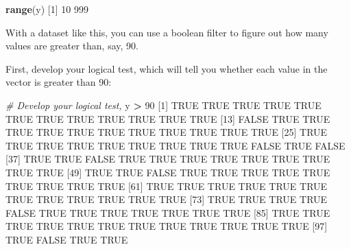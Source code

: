 \documentclass[]{book}
\newenvironment{Shaded}{\begin{snugshade}}{\end{snugshade}}
\newcommand{\CommentTok}[1]{\textcolor[rgb]{0.56,0.35,0.01}{\textit{#1}}}
\newcommand{\DecValTok}[1]{\textcolor[rgb]{0.00,0.00,0.81}{#1}}
\newcommand{\KeywordTok}[1]{\textcolor[rgb]{0.13,0.29,0.53}{\textbf{#1}}}
\newcommand{\NormalTok}[1]{#1}
\newcommand{\OperatorTok}[1]{\textcolor[rgb]{0.81,0.36,0.00}{\textbf{#1}}}
\newcommand{\OtherTok}[1]{\textcolor[rgb]{0.56,0.35,0.01}{#1}}
\newcommand{\StringTok}[1]{\textcolor[rgb]{0.31,0.60,0.02}{#1}}
\begin{document}
\begin{Shaded}
\begin{Highlighting}[]
\KeywordTok{range}\NormalTok{(y)}
\NormalTok{[}\DecValTok{1}\NormalTok{]  }\DecValTok{10} \DecValTok{999}
\end{Highlighting}
\end{Shaded}

With a dataset like this, you can use a boolean filter to figure out how many values are greater than, say, 90.

First, develop your logical test, which will tell you whether each value in the vector is greater than 90:

\begin{Shaded}
\begin{Highlighting}[]
\CommentTok{# Develop your logical test,}
\NormalTok{y }\OperatorTok{>}\StringTok{ }\DecValTok{90}
\NormalTok{  [}\DecValTok{1}\NormalTok{]  }\OtherTok{TRUE}  \OtherTok{TRUE}  \OtherTok{TRUE}  \OtherTok{TRUE}  \OtherTok{TRUE}  \OtherTok{TRUE}  \OtherTok{TRUE}  \OtherTok{TRUE}  \OtherTok{TRUE}  \OtherTok{TRUE}  \OtherTok{TRUE}  \OtherTok{TRUE}
\NormalTok{ [}\DecValTok{13}\NormalTok{] }\OtherTok{FALSE}  \OtherTok{TRUE}  \OtherTok{TRUE}  \OtherTok{TRUE}  \OtherTok{TRUE}  \OtherTok{TRUE}  \OtherTok{TRUE}  \OtherTok{TRUE}  \OtherTok{TRUE}  \OtherTok{TRUE}  \OtherTok{TRUE}  \OtherTok{TRUE}
\NormalTok{ [}\DecValTok{25}\NormalTok{]  }\OtherTok{TRUE}  \OtherTok{TRUE}  \OtherTok{TRUE}  \OtherTok{TRUE}  \OtherTok{TRUE}  \OtherTok{TRUE}  \OtherTok{TRUE}  \OtherTok{TRUE}  \OtherTok{TRUE} \OtherTok{FALSE}  \OtherTok{TRUE} \OtherTok{FALSE}
\NormalTok{ [}\DecValTok{37}\NormalTok{]  }\OtherTok{TRUE}  \OtherTok{TRUE} \OtherTok{FALSE}  \OtherTok{TRUE}  \OtherTok{TRUE}  \OtherTok{TRUE}  \OtherTok{TRUE}  \OtherTok{TRUE}  \OtherTok{TRUE}  \OtherTok{TRUE}  \OtherTok{TRUE}  \OtherTok{TRUE}
\NormalTok{ [}\DecValTok{49}\NormalTok{]  }\OtherTok{TRUE}  \OtherTok{TRUE} \OtherTok{FALSE}  \OtherTok{TRUE}  \OtherTok{TRUE}  \OtherTok{TRUE}  \OtherTok{TRUE}  \OtherTok{TRUE}  \OtherTok{TRUE}  \OtherTok{TRUE}  \OtherTok{TRUE}  \OtherTok{TRUE}
\NormalTok{ [}\DecValTok{61}\NormalTok{]  }\OtherTok{TRUE}  \OtherTok{TRUE}  \OtherTok{TRUE}  \OtherTok{TRUE}  \OtherTok{TRUE}  \OtherTok{TRUE}  \OtherTok{TRUE}  \OtherTok{TRUE}  \OtherTok{TRUE}  \OtherTok{TRUE}  \OtherTok{TRUE}  \OtherTok{TRUE}
\NormalTok{ [}\DecValTok{73}\NormalTok{]  }\OtherTok{TRUE}  \OtherTok{TRUE}  \OtherTok{TRUE}  \OtherTok{TRUE} \OtherTok{FALSE}  \OtherTok{TRUE}  \OtherTok{TRUE}  \OtherTok{TRUE}  \OtherTok{TRUE}  \OtherTok{TRUE}  \OtherTok{TRUE}  \OtherTok{TRUE}
\NormalTok{ [}\DecValTok{85}\NormalTok{]  }\OtherTok{TRUE}  \OtherTok{TRUE}  \OtherTok{TRUE}  \OtherTok{TRUE}  \OtherTok{TRUE}  \OtherTok{TRUE}  \OtherTok{TRUE}  \OtherTok{TRUE}  \OtherTok{TRUE}  \OtherTok{TRUE}  \OtherTok{TRUE}  \OtherTok{TRUE}
\NormalTok{ [}\DecValTok{97}\NormalTok{]  }\OtherTok{TRUE} \OtherTok{FALSE}  \OtherTok{TRUE}  \OtherTok{TRUE}
\end{Highlighting}
\end{Shaded}
\end{document}
